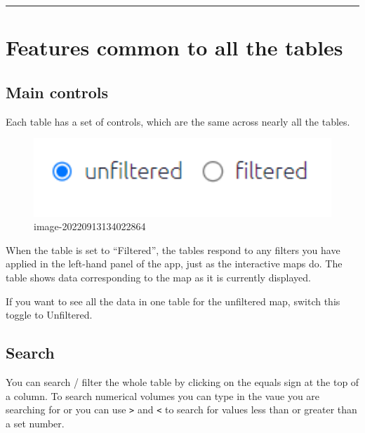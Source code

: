 \documentclass[
]{book}
\begin{document}
\begin{center}\rule{0.5\linewidth}{0.5pt}\end{center}

\hypertarget{tables_common}{%
\section{Features common to all the tables}\label{tables_common}}

\hypertarget{main-controls-1}{%
\subsection{Main controls}\label{main-controls-1}}

Each table has a set of controls, which are the same across nearly all the tables.

\begin{figure}
\centering
\includegraphics[width=6.77083in,height=\textheight]{_assets/image-20220913134022864.png}
\caption{image-20220913134022864}
\end{figure}

When the table is set to ``Filtered'', the tables respond to any filters you have applied in the left-hand panel of the app, just as the interactive maps do. The table shows data corresponding to the map as it is currently displayed.

If you want to see all the data in one table for the unfiltered map, switch this toggle to Unfiltered.

\hypertarget{search-1}{%
\subsection{Search}\label{search-1}}

You can search / filter the whole table by clicking on the equals sign at the top of a column. To search numerical volumes you can type in the vaue you are searching for or you can use \texttt{\textgreater{}} and \texttt{\textless{}} to search for values less than or greater than a set number.
\end{document}
